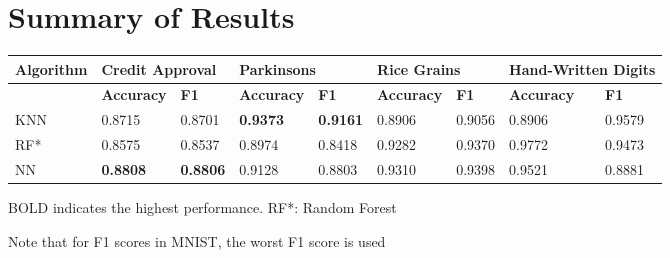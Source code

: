 \section{Summary of Results}
\begin{table}[!ht]
    \centering
    \begin{tabular}{l|l|l|l|l|l|l|l|l}
    \hline
        Algorithm & \multicolumn{2}{l}{Credit Approval} & \multicolumn{2}{l}{Parkinsons} & \multicolumn{2}{l}{Rice Grains} & \multicolumn{2}{l}{Hand-Written Digits} \\ \hline
        ~   & \textbf{Accuracy} & \textbf{F1}     & \textbf{Accuracy} & \textbf{F1}     & \textbf{Accuracy} & \textbf{F1} & \textbf{Accuracy} & \textbf{F1} \\ \hline
        KNN & 0.8715            & 0.8701          & \textbf{0.9373}   & \textbf{0.9161} & 0.8906            & 0.9056      & 0.8906            & 0.9579\\
        RF* & 0.8575            & 0.8537          & 0.8974            & 0.8418          & 0.9282            & 0.9370      & 0.9772            & 0.9473\\
        NN  & \textbf{0.8808}   & \textbf{0.8806} & 0.9128            & 0.8803          & 0.9310            & 0.9398      & 0.9521            & 0.8881\\
    \end{tabular}
\end{table}

BOLD indicates the highest performance. 
RF*: Random Forest

Note that for F1 scores in MNIST, the worst F1 score is used
